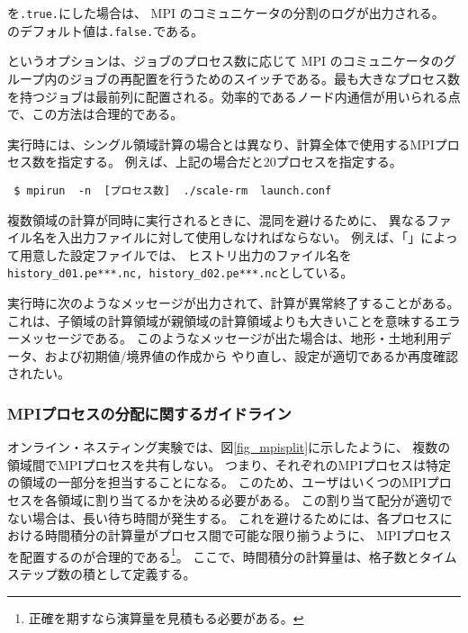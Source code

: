を\verb|.true.|にした場合は、
MPI のコミュニケータの分割のログが出力される。
のデフォルト値は\verb|.false.|である。

というオプションは、ジョブのプロセス数に応じて MPI のコミュニケータのグループ内のジョブの再配置を行うためのスイッチである。最も大きなプロセス数を持つジョブは最前列に配置される。効率的であるノード内通信が用いられる点で、この方法は合理的である。


実行時には、シングル領域計算の場合とは異なり、計算全体で使用するMPIプロセス数を指定する。
例えば、上記の場合だと20プロセスを指定する。
\begin{verbatim}
 $ mpirun  -n  [プロセス数]  ./scale-rm  launch.conf
\end{verbatim}

複数領域の計算が同時に実行されるときに、混同を避けるために、
異なるファイル名を入出力ファイルに対して使用しなければならない。
例えば、「\makeconftool」によって用意した設定ファイルでは、
ヒストリ出力のファイル名を\verb|history_d01.pe***.nc, history_d02.pe***.nc|としている。

実行時に次のようなメッセージが出力されて、計算が異常終了することがある。
これは、子領域の計算領域が親領域の計算領域よりも大きいことを意味するエラーメッセージである。
このようなメッセージが出た場合は、地形・土地利用データ、および初期値/境界値の作成から
やり直し、設定が適切であるか再度確認されたい。

\subsubsection{MPIプロセスの分配に関するガイドライン}
オンライン・ネスティング実験では、図\ref{fig_mpisplit}に示したように、
複数の領域間でMPIプロセスを共有しない。
つまり、それぞれのMPIプロセスは特定の領域の一部分を担当することになる。
このため、ユーザはいくつのMPIプロセスを各領域に割り当てるかを決める必要がある。
この割り当て配分が適切でない場合は、長い待ち時間が発生する。
これを避けるためには、各プロセスにおける時間積分の計算量がプロセス間で可能な限り揃うように、
MPIプロセスを配置するのが合理的である\footnote{正確を期すなら演算量を見積もる必要がある。}。
ここで、時間積分の計算量は、格子数とタイムステップ数の積として定義する。


